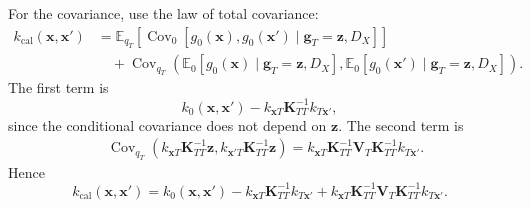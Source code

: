 \documentclass[a4paper,12pt]{article}
\begin{document}
\begin{appendix}
For the covariance, use the law of total covariance:
\[
\begin{aligned}
k_{\mathrm{cal}}(\mathbf{x},\mathbf{x}')
&=
\mathbb{E}_{q_T}
\left[
\operatorname{Cov}_0
\left[
g_0(\mathbf{x}),g_0(\mathbf{x}')
\mid
\mathbf{g}_T=\mathbf{z},D_X
\right]
\right] \\
&\quad+
\operatorname{Cov}_{q_T}
\left(
\mathbb{E}_0[g_0(\mathbf{x})\mid \mathbf{g}_T=\mathbf{z},D_X],
\mathbb{E}_0[g_0(\mathbf{x}')\mid \mathbf{g}_T=\mathbf{z},D_X]
\right).
\end{aligned}
\]
The first term is
\[
k_0(\mathbf{x},\mathbf{x}')
-
k_{\mathbf{x}T}\mathbf{K}_{TT}^{-1}k_{T\mathbf{x}'},
\]
since the conditional covariance does not depend on \(\mathbf{z}\). The second term is
\[
\begin{aligned}
&\operatorname{Cov}_{q_T}
\left(
k_{\mathbf{x}T}\mathbf{K}_{TT}^{-1}\mathbf{z},
k_{\mathbf{x}'T}\mathbf{K}_{TT}^{-1}\mathbf{z}
\right)  =
k_{\mathbf{x}T}
\mathbf{K}_{TT}^{-1}
\mathbf{V}_T
\mathbf{K}_{TT}^{-1}
k_{T\mathbf{x}'}.
\end{aligned}
\]
Hence
\[
\boxed{
k_{\mathrm{cal}}(\mathbf{x},\mathbf{x}')
=
k_0(\mathbf{x},\mathbf{x}')
-
k_{\mathbf{x}T}\mathbf{K}_{TT}^{-1}k_{T\mathbf{x}'}
+
k_{\mathbf{x}T}
\mathbf{K}_{TT}^{-1}
\mathbf{V}_T
\mathbf{K}_{TT}^{-1}
k_{T\mathbf{x}'}
}.
\]

\end{appendix}
\clearpage


\end{document}

